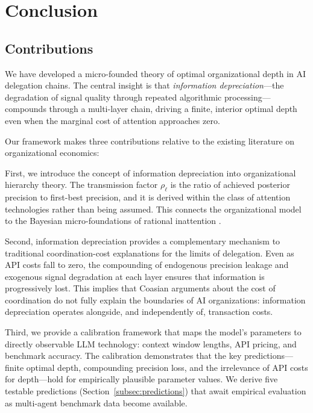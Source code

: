 \section{Conclusion}
\label{sec:conclusion}

\subsection{Contributions}

We have developed a micro-founded theory of optimal organizational depth in AI delegation chains. The central insight is that \emph{information depreciation}---the degradation of signal quality through repeated algorithmic processing---compounds through a multi-layer chain, driving a finite, interior optimal depth even when the marginal cost of attention approaches zero.

Our framework makes three contributions relative to the existing literature on organizational economics:

First, we introduce the concept of information depreciation into organizational hierarchy theory. The transmission factor $\rho_\ell$ is the ratio of achieved posterior precision to first-best precision, and it is derived within the class of attention technologies rather than being assumed. This connects the organizational model to the Bayesian micro-foundations of rational inattention \citep{sims2003implications}.

Second, information depreciation provides a complementary mechanism to traditional coordination-cost explanations for the limits of delegation. Even as API costs fall to zero, the compounding of endogenous precision leakage and exogenous signal degradation at each layer ensures that information is progressively lost. This implies that Coasian arguments about the cost of coordination do not fully explain the boundaries of AI organizations: information depreciation operates alongside, and independently of, transaction costs.

Third, we provide a calibration framework that maps the model's parameters to directly observable LLM technology: context window lengths, API pricing, and benchmark accuracy. The calibration demonstrates that the key predictions---finite optimal depth, compounding precision loss, and the irrelevance of API costs for depth---hold for empirically plausible parameter values. We derive five testable predictions (Section~\ref{subsec:predictions}) that await empirical evaluation as multi-agent benchmark data become available.

